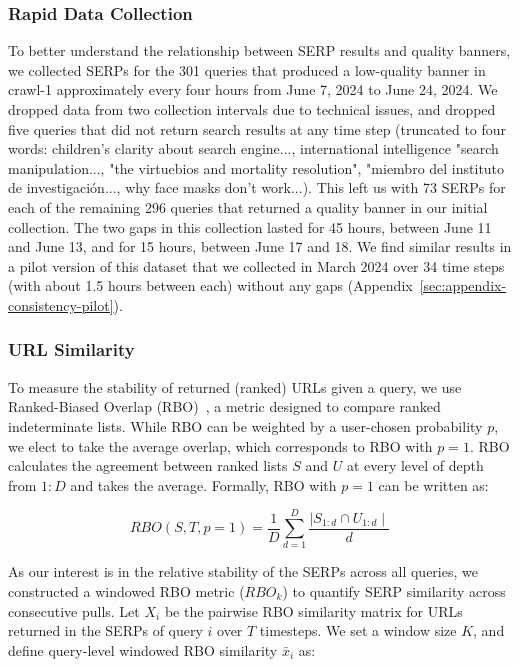 {\subsubsection{Rapid Data Collection}
\label{sec:methods-stability-temporal}

To better understand the relationship between SERP results and quality banners, we collected SERPs for the 301 queries that produced a low-quality banner in crawl-1 approximately every four hours from June 7, 2024 to June 24, 2024. 
We dropped data from two collection intervals due to technical issues, and dropped five queries that did not return search results at any time step (truncated to four words: children's clarity about search engine..., international intelligence "search manipulation..., "the virtuebios and mortality resolution", "miembro del instituto de investigación..., why face masks don’t work...). 
This left us with 73 SERPs for each of the remaining 296 queries that returned a quality banner in our initial collection. 
The two gaps in this collection lasted for 45 hours, between June 11 and June 13, and for 15 hours, between June 17 and 18.
We find similar results in a pilot version of this dataset that we collected in March 2024 over 34 time steps (with about 1.5 hours between each) without any gaps (Appendix~\ref{sec:appendix-consistency-pilot}).

\subsubsection{URL Similarity}
\label{sec:methods-stability-rbo}

To measure the stability of returned (ranked) URLs given a query, we use Ranked-Biased Overlap (RBO)~\citep{webber2010similarity},
a metric designed to compare ranked indeterminate lists. While RBO can be weighted by a user-chosen probability $p$, we elect to take the average overlap, which corresponds to RBO with $p=1$. RBO calculates the agreement between ranked lists $S$ and $U$ at every level of depth from $1:D$ and takes the average. Formally, RBO with $p=1$ can be written as:

\begin{equation}
    RBO(S,T, p=1) = \frac{1}{D} \sum^D_{d=1} \frac{\mid S_{1:d} \cap U_{1:d} \mid}{d}
\label{eq:AO}
\end{equation}

As our interest is in the relative stability of the SERPs across all queries, we constructed a windowed RBO metric ($RBO_k$) to quantify SERP similarity across consecutive pulls. 
Let $X_i$ be the pairwise RBO similarity matrix for URLs returned in the SERPs of query $i$ over $T$ timesteps. We set a window size $K$, and define query-level windowed RBO similarity $\bar{x}_i$ as:

}
